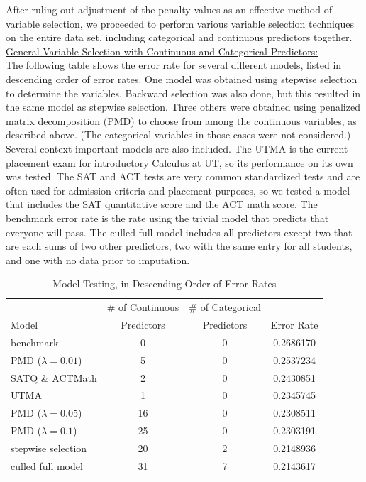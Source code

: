 \documentclass{article}
\begin{document}
After ruling out adjustment of the penalty values as an effective method of variable selection, we proceeded to perform various variable selection techniques on the entire data set, including categorical and continuous predictors together.\\

\underline{General Variable Selection with Continuous and Categorical Predictors:}\\

The following table shows the error rate for several different models, listed in descending order of error rates.  One model was obtained using stepwise selection to determine the variables.  Backward selection was also done, but this resulted in the same model as stepwise selection.  Three others were obtained using penalized matrix decomposition (PMD) to choose from among the continuous variables, as described above.  (The categorical variables in those cases were not considered.)  Several context-important models are also included.  The UTMA is the current placement exam for introductory Calculus at UT, so its performance on its own was tested.  The SAT and ACT tests are very common standardized tests and are often used for admission criteria and placement purposes, so we tested a model that includes the SAT quantitative score and the ACT math score.  The benchmark error rate is the rate using the trivial model that predicts that everyone will pass.  The culled full model includes all predictors except two that are each sums of two other predictors, two with the same entry for all students, and one with no data prior to imputation.
\begin{table}[H]
	\caption{Model Testing, in Descending Order of Error Rates}
	\label{Variable Selection}
	\centering
	\begin{tabular}{lccc}
		\toprule
				& \# of Continuous	& \# of Categorical	\\
		Model	& Predictors		& Predictors	& Error Rate	\\	
		\midrule
		benchmark				& 0		& 0	& 0.2686170	\\
		PMD ($\lambda=0.01$)	& 5		& 0	& 0.2537234	\\
		SATQ \& ACTMath			& 2		& 0	& 0.2430851	\\
		UTMA					& 1		& 0	& 0.2345745	\\
		PMD ($\lambda=0.05$)	& 16	& 0	& 0.2308511	\\
		PMD ($\lambda=0.1$)		& 25	& 0	& 0.2303191	\\
		stepwise selection		& 20	& 2	& 0.2148936	\\
		culled full model		& 31	& 7	& 0.2143617	\\
		\bottomrule
	\end{tabular}
\end{table}
\end{document}
